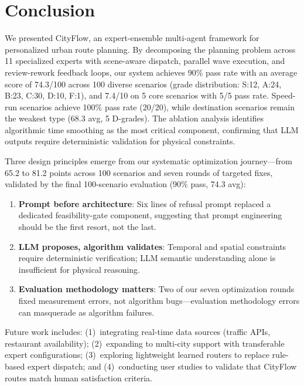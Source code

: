 \section{Conclusion}
\label{sec:conclusion}

We presented CityFlow, an expert-ensemble multi-agent framework for personalized urban route planning. By decomposing the planning problem across 11 specialized experts with scene-aware dispatch, parallel wave execution, and review-rework feedback loops, our system achieves 90\% pass rate with an average score of 74.3/100 across 100 diverse scenarios (grade distribution: S:12, A:24, B:23, C:30, D:10, F:1), and 7.4/10 on 5 core scenarios with 5/5 pass rate. Speed-run scenarios achieve 100\% pass rate (20/20), while destination scenarios remain the weakest type (68.3 avg, 5 D-grades). The ablation analysis identifies algorithmic time smoothing as the most critical component, confirming that LLM outputs require deterministic validation for physical constraints.

Three design principles emerge from our systematic optimization journey---from 65.2 to 81.2 points across 100 scenarios and seven rounds of targeted fixes, validated by the final 100-scenario evaluation (90\% pass, 74.3 avg):

\begin{enumerate}[leftmargin=*]
    \item \textbf{Prompt before architecture}: Six lines of refusal prompt replaced a dedicated feasibility-gate component, suggesting that prompt engineering should be the first resort, not the last.
    \item \textbf{LLM proposes, algorithm validates}: Temporal and spatial constraints require deterministic verification; LLM semantic understanding alone is insufficient for physical reasoning.
    \item \textbf{Evaluation methodology matters}: Two of our seven optimization rounds fixed measurement errors, not algorithm bugs---evaluation methodology errors can masquerade as algorithm failures.
\end{enumerate}

Future work includes: (1)~integrating real-time data sources (traffic APIs, restaurant availability); (2)~expanding to multi-city support with transferable expert configurations; (3)~exploring lightweight learned routers to replace rule-based expert dispatch; and (4)~conducting user studies to validate that CityFlow routes match human satisfaction criteria.
